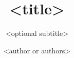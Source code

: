\documentclass{Linguistics}
\title{<title>}
\subtitle{<optional subtitle>}
\author{<author or authors>}
\begin{document}

% 
% 
% 
% 
% 
% 
% 





  \halftitlepage




 \titlepage

\end{document}
